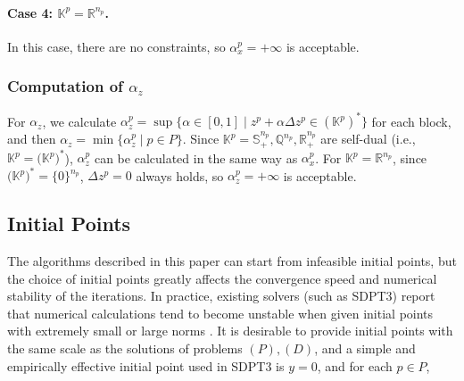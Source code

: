 \documentclass{scrartcl}
\begin{document}
\paragraph{Case 4: $\mathbb{K}^p = \mathbb{R}^{n_p}$.}
In this case, there are no constraints, so $\alpha^p_x=+\infty$ is acceptable.

\medskip

\subsubsection{Computation of $\alpha_z$}
For $\alpha_z$, we calculate $\alpha^p_z = \sup\{\alpha\in [0, 1] \mid z^p + \alpha\Delta z^p \in (\mathbb{K}^p)^*\}$ for each block, and then $\alpha_z=\min\{\alpha^p_z \mid p \in P\}$.
Since $\mathbb{K}^p=\mathbb{S}^{n_p}_+,\mathbb{Q}^{n_p},\mathbb{R}^{n_p}_+$ are self-dual (i.e., $\mathbb{K}^p = \bigl(\mathbb{K}^p\bigr)^*$), $\alpha^p_z$ can be calculated in the same way as $\alpha^p_x$.
For $\mathbb{K}^p=\mathbb{R}^{n_p}$, since $\bigl(\mathbb{K}^p\bigr)^*=\{0\}^{n_p}$, $\Delta z^p = 0$ always holds, so $\alpha^p_z=+\infty$ is acceptable.

\medskip

\subsection{Initial Points}
\label{sec:initial_points}
The algorithms described in this paper can start from infeasible initial points, but the choice of initial points greatly affects the convergence speed and numerical stability of the iterations.
In practice, existing solvers (such as SDPT3) report that numerical calculations tend to become unstable when given initial points with extremely small or large norms \cite{toh1999}.
It is desirable to provide initial points with the same scale as the solutions of problems $(P),(D)$, and a simple and empirically effective initial point used in SDPT3 is $y = 0$, and for each $p\in P$,
\end{document}
